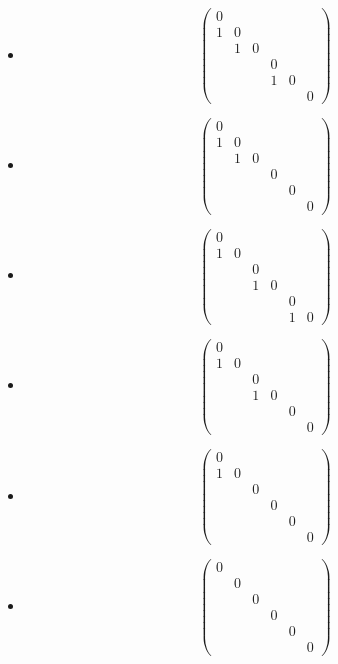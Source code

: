 \documentclass[11pt,a4paper]{article}
\begin{document}
{\begin{itemize}
\[\begin{pmatrix}
\end{pmatrix}
\]
\item
\[
\begin{pmatrix}
0&&&&&\\1&0&&&&\\&1&0&&&\\&&&0&&\\&&&1&0&\\&&&&&0
\end{pmatrix}
\]
\item
\[
\begin{pmatrix}
0&&&&&\\1&0&&&&\\&1&0&&&\\&&&0&&\\&&&&0&\\&&&&&0
\end{pmatrix}
\]
\item
\[
\begin{pmatrix}
0&&&&&\\1&0&&&&\\&&0&&&\\&&1&0&&\\&&&&0&\\&&&&1&0
\end{pmatrix}
\]
\item
\[
\begin{pmatrix}
0&&&&&\\1&0&&&&\\&&0&&&\\&&1&0&&\\&&&&0&\\&&&&&0
\end{pmatrix}
\]
\item
\[
\begin{pmatrix}
0&&&&&\\1&0&&&&\\&&0&&&\\&&&0&&\\&&&&0&\\&&&&&0
\end{pmatrix}
\]
\item
\[
\begin{pmatrix}
0&&&&&\\&0&&&&\\&&0&&&\\&&&0&&\\&&&&0&\\&&&&&0
\end{pmatrix}
\]
\end{itemize}
}
\end{document}
